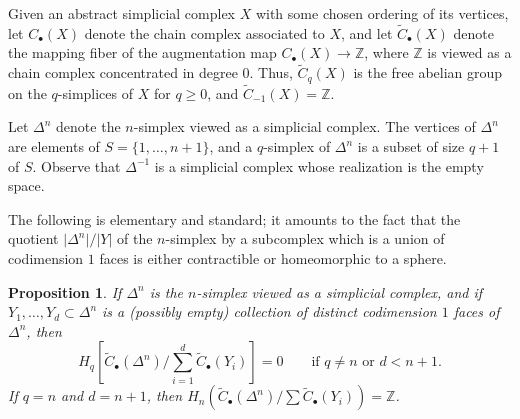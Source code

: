 \documentclass[11pt]{amsart}
\numberwithin{equation}{section}
\theoremstyle{plain}
\newtheorem{prop}[subsection]{Proposition}
\theoremstyle{remark}
\theoremstyle{plain}
\begin{document}
Given an abstract simplicial complex $X$ with some chosen ordering of
its vertices, let $C_\bullet(X)$ denote the
chain complex associated to $X$, and let $\widetilde{C}_\bullet(X)$ denote
the mapping fiber of the augmentation map $C_\bullet(X){\rightarrow} {\mathbb{Z}}$, where
${\mathbb{Z}}$ is viewed as a chain complex concentrated in degree $0$.  Thus, 
$\widetilde{C}_q(X)$ is the free abelian group on the $q$-simplices of $X$
for $q\geq0$, and $\widetilde{C}_{-1}(X)={\mathbb{Z}}$.

Let $\Delta^n$ denote the $n$-simplex viewed as a simplicial complex.
The vertices of $\Delta^n$ are elements of $S=\{1,\dots,n+1\}$, and a
$q$-simplex of $\Delta^n$ is a subset of size $q+1$ of $S$.  Observe
that $\Delta^{-1}$ is a simplicial complex whose realization is the
empty space.

The following is elementary and standard; it amounts to the fact that
the quotient ${\lvert{\Delta^n}\rvert}/{\lvert{Y}\rvert}$ of the $n$-simplex by a
subcomplex which is a union of codimension $1$ faces is either
contractible or  homeomorphic to a sphere.
\begin{prop}
If $\Delta^n$ is the $n$-simplex viewed as a simplicial complex, and
if $Y_1,\dots,Y_d\subset \Delta^n$ is a 
(possibly empty) collection of distinct codimension $1$ faces of $\Delta^n$,
then
\[
  H_q \left[\widetilde{C}_\bullet(\Delta^n)/\sum_{i=1}^d
    \widetilde{C}_\bullet(Y_i)\right] = 0\qquad 
  \text{if $q\neq n$ or $d<n+1$.}
\]
If $q=n$ and $d=n+1$, then $H_n(\widetilde{C}_\bullet(\Delta^n)/\sum
\widetilde{C}_\bullet(Y_i))={\mathbb{Z}}$. 
\end{prop}
\end{document}
